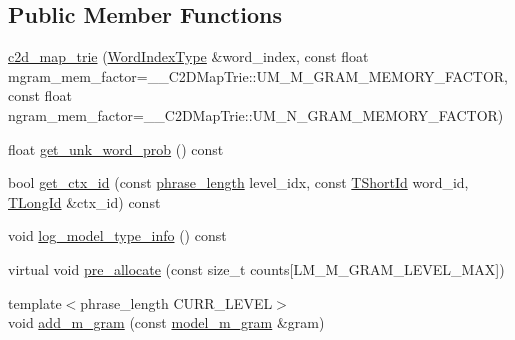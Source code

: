 \subsection*{Public Member Functions}
\begin{DoxyCompactItemize}
\item 
\hyperlink{classuva_1_1smt_1_1bpbd_1_1server_1_1lm_1_1c2d__map__trie_ad3bc6f164ab7cc95f92b4d260ab43b7d}{c2d\+\_\+map\+\_\+trie} (\hyperlink{classuva_1_1smt_1_1bpbd_1_1server_1_1lm_1_1word__index__trie__base_a64279b5b94c421b25aedaa72e73d013c}{Word\+Index\+Type} \&word\+\_\+index, const float mgram\+\_\+mem\+\_\+factor=\+\_\+\+\_\+\+C2\+D\+Map\+Trie\+::\+U\+M\+\_\+\+M\+\_\+\+G\+R\+A\+M\+\_\+\+M\+E\+M\+O\+R\+Y\+\_\+\+F\+A\+C\+T\+O\+R, const float ngram\+\_\+mem\+\_\+factor=\+\_\+\+\_\+\+C2\+D\+Map\+Trie\+::\+U\+M\+\_\+\+N\+\_\+\+G\+R\+A\+M\+\_\+\+M\+E\+M\+O\+R\+Y\+\_\+\+F\+A\+C\+T\+O\+R)
\item 
float \hyperlink{classuva_1_1smt_1_1bpbd_1_1server_1_1lm_1_1c2d__map__trie_a5a68d7999eff898e5a2a3f702d6a2575}{get\+\_\+unk\+\_\+word\+\_\+prob} () const 
\item 
bool \hyperlink{classuva_1_1smt_1_1bpbd_1_1server_1_1lm_1_1c2d__map__trie_a8bd595e79e1a2d3f5f271942405906cb}{get\+\_\+ctx\+\_\+id} (const \hyperlink{namespaceuva_1_1smt_1_1bpbd_1_1server_af068a19c2e03116caf3e3827a3e40e35}{phrase\+\_\+length} level\+\_\+idx, const \hyperlink{namespaceuva_1_1smt_1_1bpbd_1_1server_1_1lm_1_1identifiers_a33043a191e9a637dea742a89d23c8bdc}{T\+Short\+Id} word\+\_\+id, \hyperlink{namespaceuva_1_1smt_1_1bpbd_1_1server_1_1lm_1_1identifiers_a6841847096e455ad3c38689bc548b3b0}{T\+Long\+Id} \&ctx\+\_\+id) const 
\item 
void \hyperlink{classuva_1_1smt_1_1bpbd_1_1server_1_1lm_1_1c2d__map__trie_a814de2e81d1e3652971eff8de012eff5}{log\+\_\+model\+\_\+type\+\_\+info} () const 
\item 
virtual void \hyperlink{classuva_1_1smt_1_1bpbd_1_1server_1_1lm_1_1c2d__map__trie_a15bac28e77c0ba9dd1a89843bdb28984}{pre\+\_\+allocate} (const size\+\_\+t counts\mbox{[}L\+M\+\_\+\+M\+\_\+\+G\+R\+A\+M\+\_\+\+L\+E\+V\+E\+L\+\_\+\+M\+A\+X\mbox{]})
\item 
{\footnotesize template$<$phrase\+\_\+length C\+U\+R\+R\+\_\+\+L\+E\+V\+E\+L$>$ }\\void \hyperlink{classuva_1_1smt_1_1bpbd_1_1server_1_1lm_1_1c2d__map__trie_a809c2c8289abfe43305482099825cc6a}{add\+\_\+m\+\_\+gram} (const \hyperlink{classuva_1_1smt_1_1bpbd_1_1server_1_1lm_1_1m__grams_1_1model__m__gram}{model\+\_\+m\+\_\+gram} \&gram)

\end{DoxyCompactItemize}
